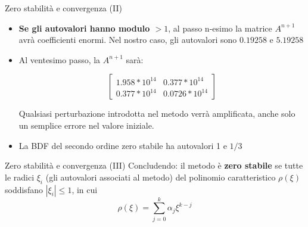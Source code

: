 \documentclass[aspectratio=169, 10pt, handout,usenames,dvipsnames]{beamer}
\begin{document}
    \begin{frame}{Zero stabilità e convergenza (II)}
        \begin{itemize}
            \item \textbf{Se gli autovalori hanno modulo $>1$}, al passo n-esimo la matrice $A^{n+1}$ avrà coefficienti enormi. Nel nostro caso, gli autovalori sono  $0.19258$ e $5.19258$
            \item Al ventesimo passo, la $A^{n+1}$ sarà: 
            \vspace{0.5cm}
            \begin{center}
                \[\begin{bmatrix} 
                1.958*10^{14} & 0.377*10^{14} \\ 
                0.377*10^{14} & 0.0726*10^{14}
                \end{bmatrix} \]
            \end{center}
            \vspace{0.5cm}
            
            
            Qualsiasi perturbazione introdotta nel metodo verrà amplificata, anche solo un semplice errore nel valore iniziale.
            \medskip
            \medskip
            \item La BDF del secondo ordine zero stabile ha autovalori 1 e $1/3$
        \end{itemize} 
    \end{frame}
    
    \begin{frame}{Zero stabilità e convergenza (III)}
        Concludendo: il metodo è \textbf{zero stabile} se tutte le radici $\xi_i$ (gli autovalori associati al metodo) del polinomio caratteristico $\rho(\xi)$ soddisfano $|\xi_i|\leq1$, in cui 
        $$
            \rho(\xi)=\displaystyle\sum_{j=0}^k \alpha_j\xi^{k-j}
        $$
    \end{frame}
  
\end{document}
